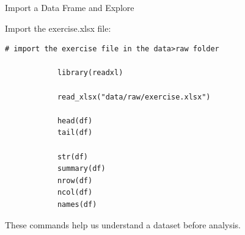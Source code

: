 \documentclass[aspectratio=169,11pt]{beamer}
\begin{document}
	
	
	\begin{frame}[fragile]{Import a Data Frame and Explore}
		
		Import the exercise.xlsx file:
		
		\begin{lstlisting}[basicstyle=\footnotesize\ttfamily]
			# import the exercise file in the data>raw folder
		
			library(readxl)
			
			read_xlsx("data/raw/exercise.xlsx")
			
			head(df)
			tail(df)
			
			str(df)
			summary(df)
			nrow(df)
			ncol(df)
			names(df)
		\end{lstlisting}
		
		
		These commands help us understand a dataset before analysis.
		
	\end{frame}
	
\end{document}
